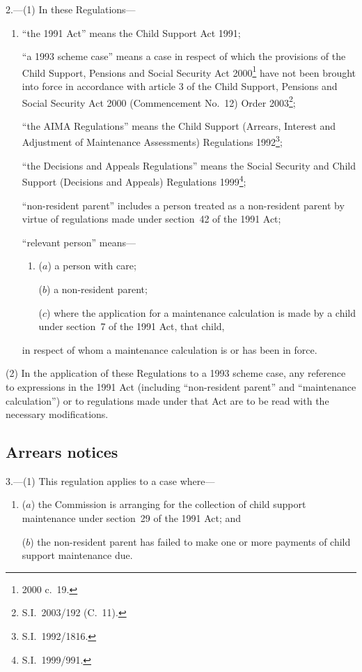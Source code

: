 \documentclass[12pt,a4paper]{article}
\begin{document}
2.---(1)  In these Regulations—
\begin{enumerate}\item[]
“the 1991 Act” means the Child Support Act 1991;

“a 1993 scheme case” means a case in respect of which the provisions of the Child Support, Pensions and Social Security Act 2000\footnote{2000 c.~19.} have not been brought into force in accordance with article 3 of the Child Support, Pensions and Social Security Act 2000 (Commencement No.~12) Order 2003\footnote{S.I.~2003/192 (C.~11).};

“the AIMA Regulations” means the Child Support (Arrears, Interest and Adjustment of Maintenance Assessments) Regulations 1992\footnote{S.I.~1992/1816.};

“the Decisions and Appeals Regulations” means the Social Security and Child Support (Decisions and Appeals) Regulations 1999\footnote{S.I.~1999/991.};

“non-resident parent” includes a person treated as a non-resident parent by virtue of regulations made under section~42 of the 1991 Act;

“relevant person” means—
\begin{enumerate}\item[]
($a$) 
a person with care;

($b$) 
a non-resident parent;

($c$) 
where the application for a maintenance calculation is made by a child under section~7 of the 1991 Act, that child,
\end{enumerate}
in respect of whom a maintenance calculation is or has been in force.
\end{enumerate}

(2) In the application of these Regulations to a 1993 scheme case, any reference to expressions in the 1991 Act (including “non-resident parent” and “maintenance calculation”) or to regulations made under that Act are to be read with the necessary modifications.

\subsection[3. Arrears notices]{Arrears notices}

3.---(1)  This regulation applies to a case where—
\begin{enumerate}\item[]
($a$) the Commission is arranging for the collection of child support maintenance under section~29 of the 1991 Act; and

($b$) the non-resident parent has failed to make one or more payments of child support maintenance due.
\end{enumerate}
\end{document}
